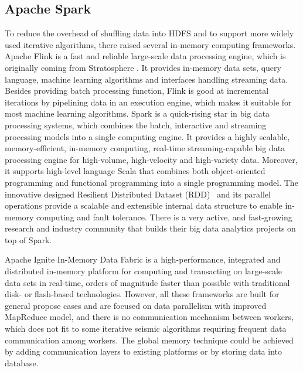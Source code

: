 \subsection{Apache Spark}
To reduce the overhead of shuffling data into HDFS and to support more widely used iterative algorithms, there raised several in-memory computing frameworks. Apache Flink \cite{ApacheFlink} is a fast and reliable large-scale data processing engine, which is originally coming from Stratosphere \cite{Alexandrov2013Stratosphere}. It provides in-memory data sets, query language, machine learning algorithms and interfaces handling streaming data. Besides providing batch processing function, Flink is good at incremental iterations by pipelining data in an execution engine, which makes it suitable for most machine learning algorithms. Spark \cite{ZahariaSCC1863113} is a quick-rising star in big data processing systems, which combines the batch, interactive and streaming~\cite{ZahariaDSE2342773} processing models into a single computing engine. It provides a highly scalable, memory-efficient, in-memory computing, real-time streaming-capable big data processing engine for high-volume, high-velocity and high-variety data. Moreover, it supports high-level language Scala that combines both object-oriented programming and functional programming into a single programming model. The innovative designed Resilient Distributed Dataset (RDD)~\cite{SparkRDD} and its parallel operations provide a scalable and extensible internal data structure to enable in-memory computing and fault tolerance. There is a very active, and fast-growing research and industry community that builds their big data analytics projects on top of Spark. 

Apache Ignite \cite{ApacheIgnite} In-Memory Data Fabric is a high-performance, integrated and distributed in-memory platform for computing and transacting on large-scale data sets in real-time, orders of magnitude faster than possible with traditional disk- or flash-based technologies. 
However, all these frameworks are built for general propose cases and are focused on data parallelism with improved MapReduce model, and there is no communication mechanism between workers, which does not fit to some iterative seismic algorithms requiring frequent data communication among workers. The global memory technique could be achieved by adding communication layers to existing platforms or by storing data into database. 

